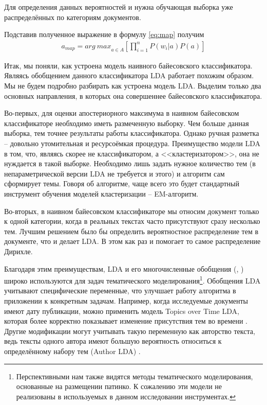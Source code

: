 Для определения данных вероятностей и нужна обучающая выборка уже распределённых по категориям документов.

Подставив полученное выражение в формулу \ref{eq:map} получим
\begin{eqnarray}
a_{map}={arg\ max}_{a\in A} [\prod_{i=1}^nP(w_i|a)P(a)]
\end{eqnarray}

Итак, мы поняли, как устроена модель наивного байесовского классификатора. Являясь обобщением данного классификатора LDA работает похожим образом. Мы не будем подробно разбирать как устроена модель LDA. Выделим только два основных направления, в которых она совершеннее байесовского классификатора.

Во-первых, для оценки апостериорного максимума в наивном байесовском классификаторе необходимо иметь размеченную выборку. Чем больше данная выборка, тем точнее результаты работы классификатора. Однако ручная разметка -- довольно утомительная и ресурсоёмкая процедура. Преимущество модели LDA в том, что, являясь скорее не классификатором, а <<кластеризатором>>, она не нуждается в такой выборке. Необходимо лишь задать нужное количество тем (в непараметрической версии LDA не требуется и этого) и алгоритм сам сформирует темы. Говоря об алгоритме, чаще всего это будет стандартный инструмент обучения моделей кластеризации – EM-алгоритм. %

Во-вторых, в наивном байесовском классификаторе мы относим документ только к одной категории, когда в реальных текстах часто присутствуют сразу несколько тем. Лучшим решением было бы определить вероятностное распределение тем в документе, что и делает LDA. В этом как раз и помогает то самое распределение Дирихле.

Благодаря этим преимуществам, LDA и его многочисленные обобщения (\cite{NeedlesInAHaystack}, \cite{LDASurvey}) широко используются для задач тематического моделирования\footnote{Перспективными нам также видятся методы тематического моделирования, основанные на размещении патинко. К сожалению эти модели не реализованы в используемых в данном исследовании инструментах.}.  Обобщения LDA учитывают специфические переменные, что улучшает работу алгоритма в приложении к конкретным задачам. Например, когда исследуемые документы имеют дату публикации, можно применить модель Topics over Time LDA, которая более корректно показывает изменение присутствия тем во времени \cite{ToTLDA}. Другие модификации могут учитывать такую переменную как авторство текста, ведь тексты одного автора имеют большую вероятность относиться к определённому набору тем (Author LDA) \cite{authorLDA}.

